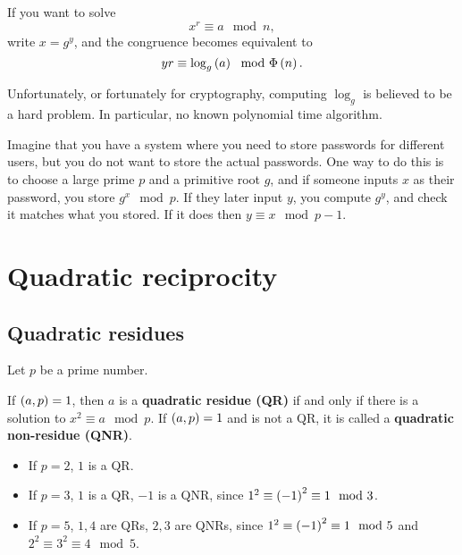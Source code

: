 \begin{example*}
If you want to solve
$$ x^r \equiv a \mod n, $$
write $ x = g^y $, and the congruence becomes equivalent to
$$ yr \equiv \log_g\br{a} \mod \Phi\br{n}. $$
\end{example*}

Unfortunately, or fortunately for cryptography, computing $ \log_g $ is believed to be a hard problem. In particular, no known polynomial time algorithm.

\begin{example*}
Imagine that you have a system where you need to store passwords for different users, but you do not want to store the actual passwords. One way to do this is to choose a large prime $ p $ and a primitive root $ g $, and if someone inputs $ x $ as their password, you store $ g^x \mod p $. If they later input $ y $, you compute $ g^y $, and check it matches what you stored. If it does then $ y \equiv x \mod p - 1 $.
\end{example*}

\pagebreak

\section{Quadratic reciprocity}

\subsection{Quadratic residues}

Let $ p $ be a prime number.

\begin{definition}
If $ \br{a, p} = 1 $, then $ a $ is a \textbf{quadratic residue (QR)} if and only if there is a solution to $ x^2 \equiv a \mod p $. If $ \br{a, p} = 1 $ and is not a QR, it is called a \textbf{quadratic non-residue (QNR)}.
\end{definition}

\begin{example*}
\hfill
\begin{itemize}
\item If $ p = 2 $, $ 1 $ is a QR.
\item If $ p = 3 $, $ 1 $ is a QR, $ -1 $ is a QNR, since $ 1^2 \equiv \br{-1}^2 \equiv 1 \mod 3 $.
\item If $ p = 5 $, $ 1, 4 $ are QRs, $ 2, 3 $ are QNRs, since $ 1^2 \equiv \br{-1}^2 \equiv 1 \mod 5 $ and $ 2^2 \equiv 3^2 \equiv 4 \mod 5 $.
\end{itemize}
\end{example*}

